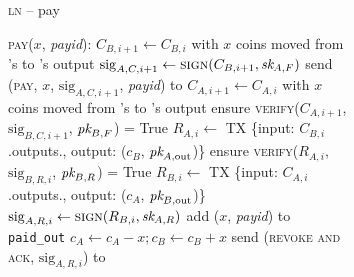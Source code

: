 \begin{figure}[H]
\begin{figure}[H]
  \begin{processbox}{\textsc{ln} -- pay}
    \begin{algorithmic}[1]
      \State \textsc{pay}($x$, \textit{payid}): 
      \Indent
        \State $C_{B, i+1} \gets C_{B, i}$ with $x$ coins moved from \alice's to
        \bob's output
        \State $\mathrm{sig}_{A, C, i+1} \gets \textsc{sign}(C_{B, i+1}, \textit{sk}_{A,
        F})$ 
        \State send (\textsc{pay}, $x$, $\mathrm{sig}_{A, C, i+1}$,
        \textit{payid}) to \bob
        \State {}
        \State {}
        \State {}
        \State {} 
        \State {}
        \State {}
        \State {}
        \State $C_{A, i+1} \gets C_{A, i}$ with $x$ coins moved from \alice's to
        \bob's output
        \State ensure \textsc{verify}($C_{A, i+1}$, $\mathrm{sig}_{B, C, i+1}$,
        $\textit{pk}_{B, F}$) = True
        \State $R_{A, i} \gets$ TX \{input: $C_{B, i}$.outputs.\alice, output:
        ($c_B$, $\textit{pk}_{A, \mathrm{out}}$)\}
        \State ensure \textsc{verify}($R_{A, i}$, $\mathrm{sig}_{B, R, i}$,
        $\textit{pk}_{B, R}$) = True
        \State $R_{B, i} \gets$ TX \{input: $C_{A, i}$.outputs.\bob, output:
        ($c_A$, $\textit{pk}_{B, \mathrm{out}}$)\}
        \State $\mathrm{sig}_{A, R, i} \gets \textsc{sign}(R_{B, i}, \textit{sk}_{A, R})$
        \State add ($x$, \textit{payid}) to \texttt{paid\_out}
        \State $c_A \gets c_A - x; c_B \gets c_B + x$
        \State send (\textsc{revoke and ack}, $\mathrm{sig}_{A, R, i}$) to \bob
        \State {}
        \State {}
        \State {}
        \State {}
      \EndIndent
    \end{algorithmic}
  \end{processbox}
  \caption{}
  \label{code:ln:pay}
\end{figure}


\end{figure}
